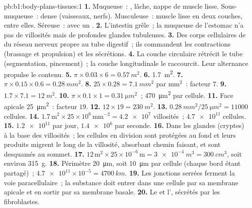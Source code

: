\begin{solution}{pb:b1:body-plans-tissues:1}
\textbf{1.} Muqueuse~: ,  lâche, nappe de
muscle lisse. Sous-muqueuse~:  dense (vaisseaux, nerfs).
Musculeuse~: muscle lisse en deux couches,  entre elles.
Séreuse~:  avec un .
\textbf{2.} L'intestin grêle~; la muqueuse de l'estomac n'a pas de
villosités mais de profondes glandes tubuleuses.
\textbf{3.} Des corps cellulaires de  du réseau nerveux propre
au tube digestif~; ils commandent les contractions (brassage et
propulsion) et les sécrétions.
\textbf{4.} La couche circulaire rétrécit le tube (segmentation,
pincement)~; la couche longitudinale le raccourcit. Leur alternance
propulse le contenu.
\textbf{5.} $\pi\times 0.03\times 6 = \qty{0.57}{m^2}$.
\textbf{6.} \qty{1.7}{m^2}.
\textbf{7.} $\pi\times 0.15\times 0.6 = \qty{0.28}{mm^2}$.
\textbf{8.} $25\times 0.28 = \qty{7.1}{mm^2}$ par mm$^2$~: facteur $7$.
\textbf{9.} $1.7\times 7.1 = \qty{12}{m^2}$.
\textbf{10.} $\pi\times 0.1\times 1 = \qty{0.31}{\micro m^2}$~;
\qty{470}{\micro m^2} par cellule.
\textbf{11.} Face apicale \qty{25}{\micro m^2}~: facteur $19$.
\textbf{12.} $12\times 19 = \qty{230}{m^2}$.
\textbf{13.} $\qty{0.28}{mm^2}/\qty{25}{\micro m^2} = \num{11000}$ cellules.
\textbf{14.} $1.7\,\mathrm{m^2}\times 25\times 10^6\,\mathrm{mm^{-2}} =
\num{4.2e7}$ villosités~; $\num{4.7e11}$ cellules.
\textbf{15.} $\num{1.2e11}$ par jour, $\num{1.4e6}$ par seconde.
\textbf{16.} Dans les glandes (cryptes) à la base des villosités~; les
cellules en division sont protégées au fond et leurs produits migrent le
long de la villosité, absorbant chemin faisant, et sont desquamés au
sommet.
\textbf{17.} $12\,\mathrm{m^2}\times 25\times 10^{-6}\,\mathrm{m} =
\qty{3e-4}{m^3} = \qty{300}{cm^3}$, soit environ \qty{315}{g}.
\textbf{18.} Périmètre \qty{20}{\micro m}, soit \qty{10}{\micro m} par
cellule (chaque bord étant partagé)~;
$\num{4.7e11}\times 10^{-5} = \qty{4700}{km}$.
\textbf{19.} Les jonctions serrées ferment la voie paracellulaire~; la
substance doit entrer dans une cellule par sa membrane apicale et en
sortir par sa membrane basale.
\textbf{20.} Le  et l', sécrétés par les fibroblastes.

\end{solution}
